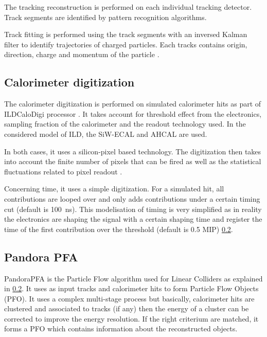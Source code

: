 The tracking reconstruction is performed on each individual tracking detector. Track segments are identified by pattern recognition algorithms.

Track fitting is performed using the track segments with an inversed Kalman filter to identify trajectories of charged particles. Each tracks contains origin, direction, charge and momentum of the particle \cite{Fruhwirth:1987fm}.

\subsection{Calorimeter digitization}

The calorimeter digitization is performed on simulated calorimeter hits as part of ILDCaloDigi processor \cite{Jeans2015}. It takes account for threshold effect from the electronics, sampling fraction of the calorimeter and the readout technology used. In the considered model of ILD, the SiW-ECAL and AHCAL are used.

In both cases, it uses a silicon-pixel based technology. The digitization then takes into account the finite number of pixels that can be fired as well as the statistical fluctuations related to pixel readout \cite{Hartbrich:2016bbz}.

Concerning time, it uses a simple digitization. For a simulated hit, all contributions are looped over and only adds contributions under a certain timing cut (default is \SI{100}{\ns}). This modelisation of timing is very simplified as in reality the electronics are shaping the signal with a certain shaping time and register the time of the first contribution over the threshold (default is 0.5 MIP) \ref{}.

\subsection{Pandora PFA}

PandoraPFA \cite{Thomson:2009rp} is the Particle Flow algorithm used for Linear Colliders as explained in \ref{}. It uses as input tracks and calorimeter hits to form Particle Flow Objects (PFO). It uses a complex multi-stage process but basically, calorimeter hits are clustered and associated to tracks (if any) then the energy of a cluster can be corrected to improve the energy resolution. If the right criterium are matched, it forms a PFO which contains information about the reconstructed objects.
